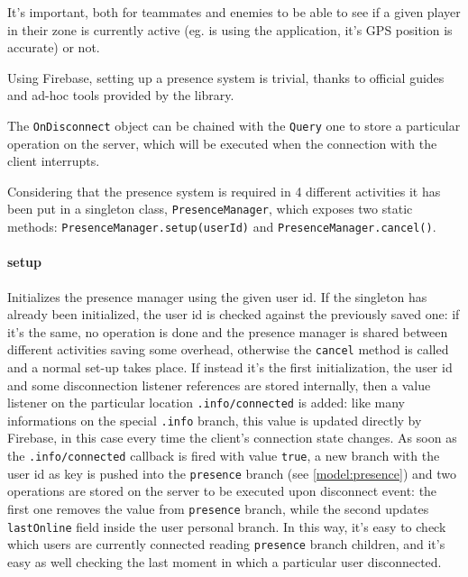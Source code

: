 			It's important, both for teammates and enemies to be able to see if a given player in their zone is currently active (eg. is using the application, it's GPS position is accurate) or not.
			
			Using Firebase, setting up a presence system is trivial, thanks to official guides\cite{firebase:presence} and ad-hoc tools provided by the library.
			
			The \lstinline|OnDisconnect| object can be chained with the \lstinline|Query| one to store a particular operation on the server, which will be executed when the connection with the client interrupts.
			
			Considering that the presence system is required in 4 different activities it has been put in a singleton class, \lstinline|PresenceManager|, which exposes two static methods: \lstinline|PresenceManager.setup(userId)| and \lstinline|PresenceManager.cancel()|.
		 
			\paragraph{setup}
			Initializes the presence manager using the given user id.
			If the singleton has already been initialized, the user id is checked against the previously saved one: if it's the same, no operation is done  and the presence manager is shared between different activities saving some overhead, otherwise the \lstinline|cancel| method is called and a normal set-up takes place.
			If instead it's the first initialization, the user id and some disconnection listener references are stored internally, then a value listener on the particular location \lstinline|.info/connected| is added: like many informations on the special \lstinline|.info| branch, this value is updated directly by Firebase, in this case every time the client's connection state changes.
			As soon as the \lstinline|.info/connected| callback is fired with value \lstinline|true|, a new branch with the user id as key is pushed into the \lstinline|presence| branch (see \autoref{model:presence}) and two operations are stored on the server to be executed upon disconnect event: the first one removes the value from \lstinline|presence| branch, while the second updates \lstinline|lastOnline| field inside the user personal branch.
			In this way, it's easy to check which users are currently connected reading  \lstinline|presence| branch children, and it's easy as well checking the last moment in which a particular user disconnected.
			
